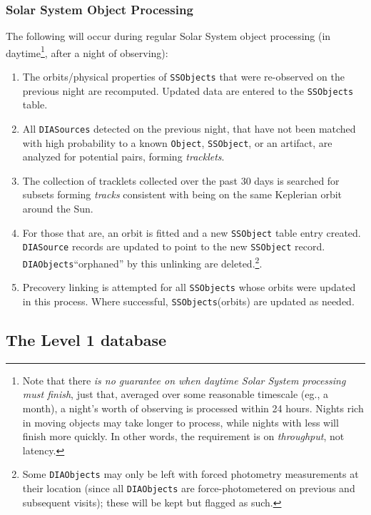 \documentclass[12pt]{article}
\newcommand{\code}[1]{\texttt{#1}}
\newcommand{\DIASource}{\code{DIASource}\xspace}
\newcommand{\DIASources}{\code{DIASources}\xspace}
\newcommand{\DIAObjects}{\code{DIAObjects}\xspace}
\newcommand{\DB}{{Level 1 database}\xspace}
\newcommand{\Object}{\code{Object}\xspace}
\newcommand{\SSObject}{\code{SSObject}\xspace}
\newcommand{\SSObjects}{\code{SSObjects}\xspace}
\begin{document}
\subsubsection{Solar System Object Processing}
\label{sec:ssProcessing}

The following will occur during regular Solar System object processing (in
daytime\footnote{Note that there {\em is no guarantee on when daytime Solar
System processing must finish}, just that, averaged over some reasonable
timescale (eg., a month), a night's worth of observing is processed within 24
hours. Nights rich in moving objects may take longer to process, while nights
with less will finish more quickly. In other words, the requirement is on {\em
throughput}, not latency.}, after a night of observing):
%
\begin{enumerate}
\item The orbits/physical properties of \SSObjects that were re-observed on
      the previous night are recomputed. Updated data are entered to the
      \SSObjects table.
\item All \DIASources detected on the previous night, that have not been
      matched with high probability to a known \Object, \SSObject, or an
      artifact, are analyzed for potential pairs, forming {\em tracklets}.
\item The collection of tracklets collected over the past 30 days is searched
      for subsets forming {\em tracks} consistent with being on the same
      Keplerian orbit around the Sun.
\item For those that are, an orbit is fitted and a new \SSObject table entry
      created. \DIASource records are updated to point to the new \SSObject
      record. \DIAObjects ``orphaned'' by this unlinking are
      deleted.\footnote{Some \DIAObjects may only be left with forced
      photometry measurements at their location (since all \DIAObjects are
      force-photometered on previous and subsequent visits); these will be
      kept but flagged as such.}.
\item Precovery linking is attempted for all \SSObjects whose orbits were
      updated in this process. Where successful, \SSObjects (orbits) are
      updated as needed.
\end{enumerate}

\subsection{The \DB}
\label{sec:level1db}
\end{document}
